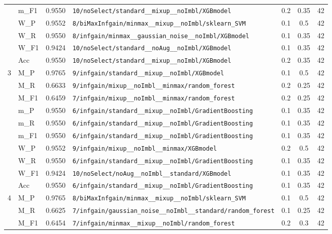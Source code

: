 \begin{table}[htbp]
\begin{tabular}{|c|l|c|>{\ttfamily\footnotesize}p{7.2cm}|c|c|c|}
 & m\_F1 & 0.9550 & \texttt{10/noSelect/standard\_\_mixup\_\_noImbl/XGBmodel} & 0.2 & 0.35  & 42 \\ 
 & W\_P & 0.9552 & \texttt{8/biMaxInfgain/minmax\_\_mixup\_\_noImbl/sklearn\_SVM} & 0.1 & 0.5  & 42 \\ 
 & W\_R & 0.9550 & \texttt{8/infgain/minmax\_\_gaussian\_noise\_\_noImbl/XGBmodel} & 0.1 & 0.35  & 42 \\ 
 & W\_F1 & 0.9424 & \texttt{10/noSelect/standard\_\_noAug\_\_noImbl/XGBmodel} & 0.1 & 0.35  & 42 \\ 
 & Acc & 0.9550 & \texttt{10/noSelect/standard\_\_mixup\_\_noImbl/XGBmodel} & 0.2 & 0.35  & 42 \\ 
\hline
\multirow{10}{*}{3} & M\_P & 0.9765 & \texttt{9/infgain/standard\_\_mixup\_\_noImbl/XGBmodel} & 0.1 & 0.5  & 42 \\ 
 & M\_R & 0.6633 & \texttt{9/infgain/mixup\_\_noImbl\_\_minmax/random\_forest} & 0.2 & 0.25  & 42 \\ 
 & M\_F1 & 0.6459 & \texttt{7/infgain/mixup\_\_noImbl\_\_minmax/random\_forest} & 0.2 & 0.25  & 42 \\ 
 & m\_P & 0.9550 & \texttt{6/infgain/standard\_\_mixup\_\_noImbl/GradientBoosting} & 0.1 & 0.35  & 42 \\ 
 & m\_R & 0.9550 & \texttt{6/infgain/standard\_\_mixup\_\_noImbl/GradientBoosting} & 0.1 & 0.35  & 42 \\ 
 & m\_F1 & 0.9550 & \texttt{6/infgain/standard\_\_mixup\_\_noImbl/GradientBoosting} & 0.1 & 0.35  & 42 \\ 
 & W\_P & 0.9552 & \texttt{9/infgain/mixup\_\_noImbl\_\_minmax/XGBmodel} & 0.2 & 0.5  & 42 \\ 
 & W\_R & 0.9550 & \texttt{6/infgain/standard\_\_mixup\_\_noImbl/GradientBoosting} & 0.1 & 0.35  & 42 \\ 
 & W\_F1 & 0.9424 & \texttt{10/noSelect/noAug\_\_noImbl\_\_standard/XGBmodel} & 0.1 & 0.35  & 42 \\ 
 & Acc & 0.9550 & \texttt{6/infgain/standard\_\_mixup\_\_noImbl/GradientBoosting} & 0.1 & 0.35  & 42 \\ 
\hline
\multirow{10}{*}{4} & M\_P & 0.9765 & \texttt{8/biMaxInfgain/minmax\_\_mixup\_\_noImbl/sklearn\_SVM} & 0.1 & 0.5  & 42 \\ 
 & M\_R & 0.6625 & \texttt{7/infgain/gaussian\_noise\_\_noImbl\_\_standard/random\_forest} & 0.1 & 0.25  & 42 \\ 
 & M\_F1 & 0.6454 & \texttt{7/infgain/minmax\_\_mixup\_\_noImbl/random\_forest} & 0.2 & 0.3  & 42 \\ 

\end{tabular}
\end{table}
